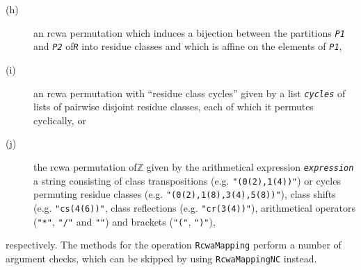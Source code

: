 \documentclass[a4paper,11pt]{report}
\begin{document}
{{{\begin{description}
\item[{(h)}]  an rcwa permutation which induces a bijection between the partitions \mbox{\texttt{\mdseries\slshape P1}} and \mbox{\texttt{\mdseries\slshape P2}} of{\nobreakspace}\mbox{\texttt{\mdseries\slshape R}} into residue classes and which is affine on the elements of \mbox{\texttt{\mdseries\slshape P1}}, 
\item[{(i)}]  an rcwa permutation with ``residue class cycles'' given by a list \mbox{\texttt{\mdseries\slshape cycles}} of lists of pairwise disjoint residue classes, each of which it permutes
cyclically, or 
\item[{(j)}]  the rcwa permutation of{\nobreakspace}{\ensuremath{\mathbb Z}} given by the
arithmetical expression \mbox{\texttt{\mdseries\slshape expression}} \texttt{}\texttt{} a string consisting of class
transpositions (e.g. \texttt{"(0(2),1(4))"}) or cycles permuting residue classes (e.g. \texttt{"(0(2),1(8),3(4),5(8))"}), class shifts (e.g. \texttt{"cs(4(6))"}, class reflections (e.g. \texttt{"cr(3(4))"}), arithmetical operators (\texttt{"*"}, \texttt{"/"} and \texttt{"\texttt{}"}) and brackets (\texttt{"("}, \texttt{")"}), 
\end{description}
 respectively. The methods for the operation \texttt{RcwaMapping} perform a number of argument checks, which can be skipped by using \texttt{RcwaMappingNC} instead. 
\begin{Verbatim}[commandchars=!@|,fontsize=\small,frame=single,label=Example]
  

\end{Verbatim}}}}
\end{document}
